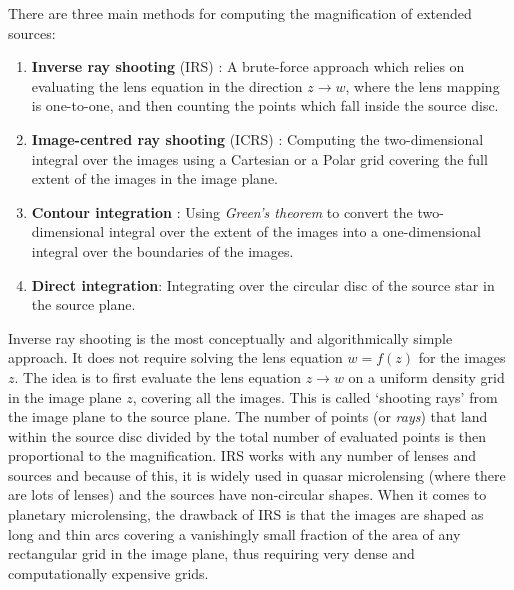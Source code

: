 \documentclass[12pt,dvipsnames]{report}
\newcommand{\ssf}[1]{\textsf{#1}}
\begin{document}
There are three main methods for computing the magnification of extended sources:
\begin{enumerate}
    \item  \textbf{Inverse ray shooting} (IRS) \citep{1986A&A...166...36K,1997MNRAS.284..172W}:
     A brute-force approach which relies on evaluating the
          lens equation in the direction $z\rightarrow w$, where the lens mapping is one-to-one,
          and then counting the points which fall inside the source disc.
    \item \textbf{Image-centred ray shooting} (ICRS) \citep{1996ApJ...472..660B,2010ApJ...716.1408B}:
        Computing the two-dimensional integral over the images using a Cartesian or a
          Polar grid covering the full extent of the images in the image plane. 
    \item  \textbf{Contour integration} \citep{1986A&A...166...36K,1995A&AS..109..597D,1997ApJ...477..580G,1998A&A...333L..79D,2007MNRAS.377.1679D}: 
    Using \emph{Green's theorem} to convert the two-dimensional integral over 
          the extent of the images into a one-dimensional integral over the boundaries of the
          images.
    \item \textbf{Direct integration}: Integrating over the circular disc of the source 
        star in the source plane.         
    \end{enumerate}
Inverse ray shooting is the most conceptually and algorithmically simple approach. 
It does not require solving the lens equation $w=f(z)$ for the images $z$. The
idea is to first evaluate the lens equation $z \rightarrow w$ on
a uniform density grid in the image plane $z$, covering all the images. This
is called `shooting rays' from the image plane to the source plane.
The number of points (or \emph{rays}) that land within the source disc
divided by the total number of evaluated points is then proportional to the
magnification. IRS works with any number of lenses and sources and
because of this, it is widely used in quasar microlensing (where there are lots of lenses)
and the sources have non-circular shapes.
When it comes to planetary microlensing, the drawback of IRS is that the images
are shaped as long and thin arcs covering a vanishingly small fraction of the area of
any rectangular grid in the image plane, thus requiring very dense and
computationally expensive grids. 

\end{document}
